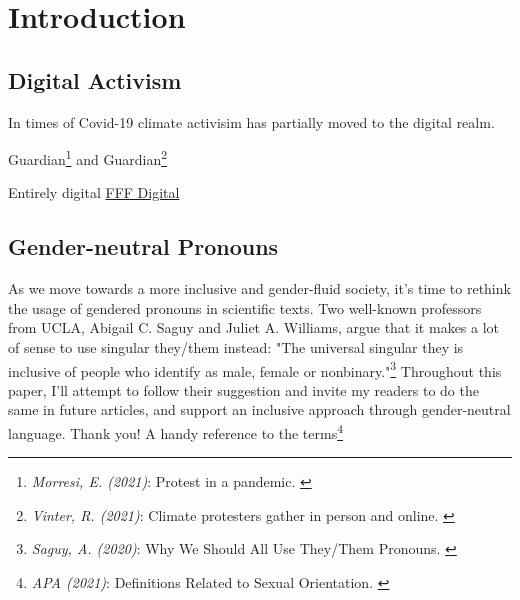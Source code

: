 %
%

\pagebreak
\section{Introduction}

\onehalfspacing

\subsection{Digital Activism}

In times of Covid-19 climate activisim has partially moved to the digital realm.

Guardian\footnote{\textit{Morresi, E. (2021)}: Protest in a pandemic. \cite{pandemicProtest}} and Guardian\footnote{\textit{Vinter, R. (2021)}: Climate protesters gather in person and online. \cite{climateProtest}} 

Entirely digital \href{https://fffdigital.carrd.co/}{FFF Digital}

\subsection{Gender-neutral Pronouns}

As we move towards a more inclusive and gender-fluid society, it's time to rethink the usage of gendered pronouns in scientific texts. Two well-known professors from UCLA, Abigail C. Saguy and Juliet A. Williams, argue that it makes a lot of sense to use singular they/them instead: "The universal singular they is inclusive of people who identify as male, female or nonbinary."\footnote{\textit{Saguy, A. (2020)}: Why We Should All Use They/Them Pronouns. \cite{pronouns}} Throughout this paper, I'll attempt to follow their suggestion and invite my readers to do the same in future articles, and support an inclusive approach through gender-neutral language. Thank you!
A handy reference to the terms\footnote{\textit{APA (2021)}: Definitions Related to Sexual Orientation. \cite{apaDefinitions}}

